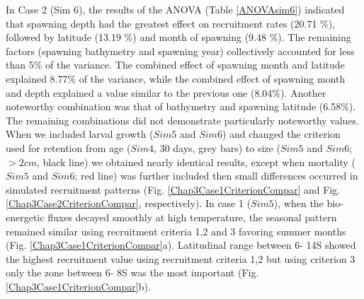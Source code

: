In Case 2 (Sim 6), the results of the ANOVA (Table \ref{ANOVAsim6}) indicated that spawning depth had the greatest effect on recruitment rates (20.71 \%), followed by latitude (13.19 \%) and month of spawning (9.48 \%). The remaining factors (spawning bathymetry and spawning year) collectively accounted for less than 5\% of the variance. The combined effect of spawning month and latitude explained 8.77\% of the variance, while the combined effect of spawning month and depth explained a value similar to the previous one (8.04\%). Another noteworthy combination was that of bathymetry and spawning latitude (6.58\%). The remaining combinations did not demonstrate particularly noteworthy values.\\

When we included larval growth ($Sim 5$ and $Sim 6$) and changed the criterion used for retention from age ($Sim 4$, 30 days, grey bars) to size ($Sim 5$ and $Sim 6$; $>2 cm$, black line) we obtained nearly identical results, except when mortality ($Sim 5$ and $Sim 6$; red line) was further included then small differences occurred in simulated recruitment patterns (Fig. \ref{Chap3Case1CriterionCompar} and Fig. \ref{Chap3Case2CriterionCompar}, respectively). In case 1 ($Sim 5$), when the bio-energetic fluxes decayed smoothly at high temperature, the seasonal pattern remained similar using recruitment criteria 1,2 and 3 favoring summer months (Fig. \ref{Chap3Case1CriterionCompar}a). Latitudinal range between 6\textdegree - 14\textdegree S showed the highest recruitment value using recruitment criteria 1,2 but using criterion 3 only the zone between 6\textdegree - 8\textdegree S was the most important (Fig. \ref{Chap3Case1CriterionCompar}b).\\

